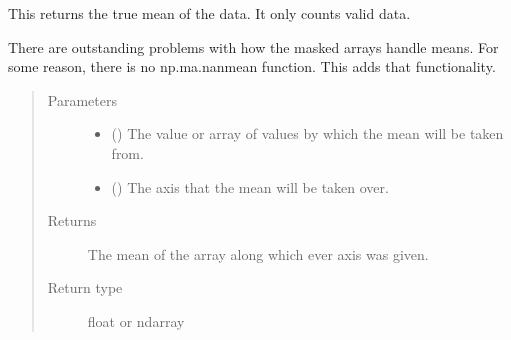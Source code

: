 \documentclass[letterpaper,10pt,english]{sphinxmanual}
\begin{document}
\begin{fulllineitems}
\label{\detokenize{docstrings/ifa_smeargle.core.mathematics:ifa_smeargle.core.mathematics.ifas_masked_mean}}
This returns the true mean of the data. It only counts
valid data.

There are outstanding problems with how the masked arrays
handle means. For some reason, there is no np.ma.nanmean
function. This adds that functionality.
\begin{quote}\begin{description}
\item[{Parameters}] \leavevmode\begin{itemize}
\item {} 
 () \textendash{} The value or array of values by which the mean will be
taken from.

\item {} 
 () \textendash{} The axis that the mean will be taken over.

\end{itemize}

\item[{Returns}] \leavevmode
{} \textendash{} The mean of the array along which ever axis was given.

\item[{Return type}] \leavevmode
float or ndarray

\end{description}\end{quote}

\end{fulllineitems}

\end{document}
